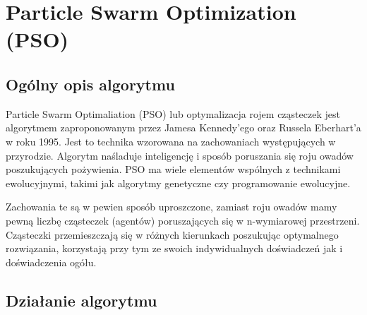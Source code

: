 
\section{Particle Swarm Optimization (PSO)}
\author{Paweł Jastrzębski}
\subsection{Ogólny opis algorytmu}
\label{pso_description}
\par Particle Swarm Optimaliation (PSO) lub optymalizacja rojem cząsteczek jest algorytmem zaproponowanym przez Jamesa Kennedy'ego oraz Russela Eberhart'a w roku 1995. Jest to technika wzorowana na zachowaniach występujących w przyrodzie. Algorytm naśladuje inteligencję i sposób poruszania się roju owadów poszukujących pożywienia. PSO ma wiele elementów wspólnych z technikami ewolucyjnymi, takimi jak algorytmy genetyczne czy programowanie ewolucyjne.
\par Zachowania te są w pewien sposób uproszczone, zamiast roju owadów mamy pewną liczbę cząsteczek (agentów) poruszających się w n-wymiarowej przestrzeni. Cząsteczki przemieszczają się w różnych kierunkach poszukując optymalnego rozwiązania, korzystają przy tym ze swoich indywidualnych doświadczeń jak i doświadczenia ogółu.
\subsection{Działanie algorytmu}
